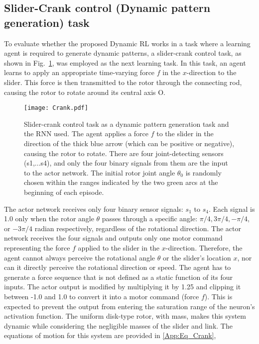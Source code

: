 \subsection{Slider-Crank control (Dynamic pattern generation) task}
To evaluate whether the proposed Dynamic RL works in a task where a learning agent
is required to generate dynamic patterns,
a slider-crank control task, as shown in Fig.~\ref{fig:Crank}, was employed as the next learning task.
In this task, an agent learns to apply an appropriate time-varying force $f$ in the $x$-direction to the slider.
This force is then transmitted to the rotor through the connecting rod,
causing the rotor to rotate around its central axis O.
\begin{figure}[htb]
\centerline{\texttt{[image: Crank.pdf]}}
\caption{Slider-crank control task as a dynamic pattern generation task and the RNN used.
The agent applies a force $f$ to the slider in the direction of the thick blue arrow
(which can be positive or negative), causing the rotor to rotate.
There are four joint-detecting sensors (s1,...s4), and only the four binary signals from them
are the input to the actor network.
The initial rotor joint angle $\theta_0$ is randomly chosen within the ranges indicated by the two green arcs at the beginning of each episode.
}
\label{fig:Crank}
\end{figure}

The actor network receives only four binary sensor signals: $s_1$ to $s_4$.
Each signal is 1.0 only when the rotor angle $\theta$ passes through a specific angle: $\pi/4, 3\pi/4, -\pi/4$, or $-3\pi/4 $ radian
respectively, regardless of the rotational direction.
The actor network receives the four signals and outputs only one motor command
representing the force $f$ applied to the slider in the $x$-direction.
Therefore, the agent cannot always perceive the rotational angle $\theta$ or the slider's location $x$,
nor can it directly perceive the rotational direction or speed.
The agent has to generate a force sequence
that is not defined as a static function of its four inputs.
The actor output is modified by multiplying it by 1.25 and clipping it between -1.0 and 1.0
to convert it into a motor command (force $f$).
This is expected to prevent the output from entering the saturation range of the neuron's activation function.
The uniform disk-type rotor, with mass, makes this system dynamic
while considering the negligible masses of the slider and link.
The equations of motion for this system are provided in \ref{App:Eq_Crank},

